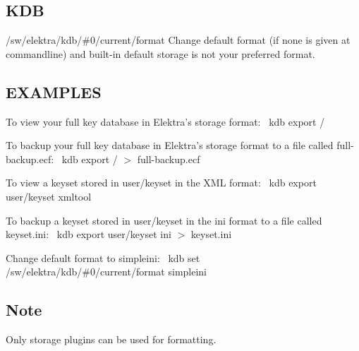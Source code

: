 \subsection*{K\+DB}


\begin{DoxyItemize}
\item {\ttfamily /sw/elektra/kdb/\#0/current/format} Change default format (if none is given at commandline) and built-\/in default {\ttfamily storage} is not your preferred format.
\end{DoxyItemize}

\subsection*{E\+X\+A\+M\+P\+L\+ES}

To view your full key database in Elektra’s {\ttfamily storage} format\+:~\newline
 {\ttfamily kdb export /}~\newline


To backup your full key database in Elektra’s {\ttfamily storage} format to a file called {\ttfamily full-\/backup.\+ecf}\+:~\newline
 {\ttfamily kdb export / $>$ full-\/backup.\+ecf}~\newline


To view a keyset stored in {\ttfamily user/keyset} in the X\+ML format\+:~\newline
 {\ttfamily kdb export user/keyset xmltool}~\newline


To backup a keyset stored in {\ttfamily user/keyset} in the {\ttfamily ini} format to a file called {\ttfamily keyset.\+ini}\+:~\newline
 {\ttfamily kdb export user/keyset ini $>$ keyset.\+ini}~\newline


Change default format to {\ttfamily simpleini}\+:~\newline
 {\ttfamily kdb set /sw/elektra/kdb/\#0/current/format simpleini}

\subsection*{Note}


\begin{DoxyItemize}
\item Only storage plugins can be used for formatting. 
\end{DoxyItemize}